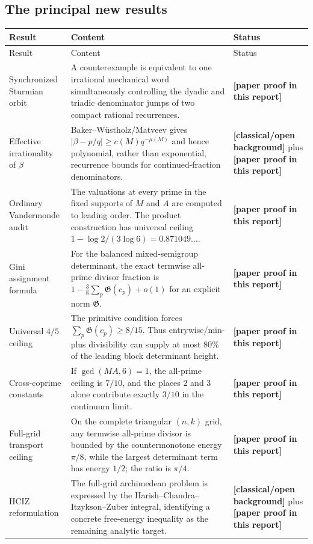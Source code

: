 \documentclass[11pt,oneside]{article}
\theoremstyle{definition}
\theoremstyle{remark}
\newcommand{\statusnew}{\textcolor{newgreen}{\textbf{[paper proof in this report]}}}
\newcommand{\statusknown}{\textcolor{classicalgray}{\textbf{[classical/open background]}}}
\begin{document}
\subsection{The principal new results}

\begin{longtable}{@{}>{\raggedright\arraybackslash}p{}>{\raggedright\arraybackslash}p{}>{\raggedright\arraybackslash}p{}@{}}
\toprule
Result & Content & Status\\
\midrule
\endfirsthead
\toprule
Result & Content & Status\\
\midrule
\endhead
Synchronized Sturmian orbit & A counterexample is equivalent to one irrational mechanical word simultaneously controlling the dyadic and triadic denominator jumps of two compact rational recurrences. & \statusnew\\
\addlinespace
Effective irrationality of $\beta$ & Baker--W\"ustholz/Matveev gives $|\beta-p/q|\ge c(M)q^{-\mu(M)}$ and hence polynomial, rather than exponential, recurrence bounds for continued-fraction denominators. & \statusknown{} plus \statusnew\\
\addlinespace
Ordinary Vandermonde audit & The valuations at every prime in the fixed supports of $M$ and $A$ are computed to leading order.  The product construction has universal ceiling $1-\log2/(3\log6)=0.871049\ldots$. & \statusnew\\
\addlinespace
Gini assignment formula & For the balanced mixed-semigroup determinant, the exact termwise all-prime divisor fraction is $1-\frac38\sum_p\mathfrak G(c_p)+o(1)$ for an explicit norm $\mathfrak G$. & \statusnew\\
\addlinespace
Universal $4/5$ ceiling & The primitive condition forces $\sum_p\mathfrak G(c_p)\ge8/15$.  Thus entrywise/min-plus divisibility can supply at most $80\%$ of the leading block determinant height. & \statusnew\\
\addlinespace
Cross-coprime constants & If $\gcd(MA,6)=1$, the all-prime ceiling is $7/10$, and the places $2$ and $3$ alone contribute exactly $3/10$ in the continuum limit. & \statusnew\\
\addlinespace
Full-grid transport ceiling & On the complete triangular $(n,k)$ grid, any termwise all-prime divisor is bounded by the countermonotone energy $\pi/8$, while the largest determinant term has energy $1/2$; the ratio is $\pi/4$. & \statusnew\\
\addlinespace
HCIZ reformulation & The full-grid archimedean problem is expressed by the Harish--Chandra--Itzykson--Zuber integral, identifying a concrete free-energy inequality as the remaining analytic target. & \statusknown{} plus \statusnew\\
\bottomrule
\end{longtable}
\end{document}
